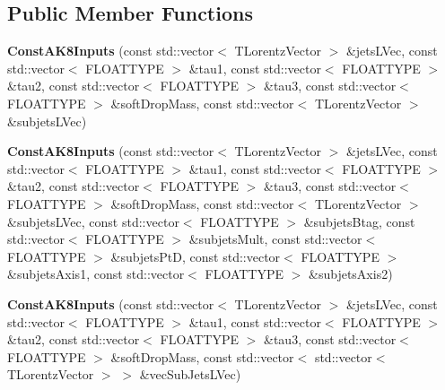 \subsection*{Public Member Functions}
\begin{DoxyCompactItemize}
\item 
\hypertarget{classttUtility_1_1ConstAK8Inputs_aaae2a8597035f10337b5454e34af790c}{{\bfseries Const\-A\-K8\-Inputs} (const std\-::vector$<$ T\-Lorentz\-Vector $>$ \&jets\-L\-Vec, const std\-::vector$<$ F\-L\-O\-A\-T\-T\-Y\-P\-E $>$ \&tau1, const std\-::vector$<$ F\-L\-O\-A\-T\-T\-Y\-P\-E $>$ \&tau2, const std\-::vector$<$ F\-L\-O\-A\-T\-T\-Y\-P\-E $>$ \&tau3, const std\-::vector$<$ F\-L\-O\-A\-T\-T\-Y\-P\-E $>$ \&soft\-Drop\-Mass, const std\-::vector$<$ T\-Lorentz\-Vector $>$ \&subjets\-L\-Vec)}\label{classttUtility_1_1ConstAK8Inputs_aaae2a8597035f10337b5454e34af790c}

\item 
\hypertarget{classttUtility_1_1ConstAK8Inputs_a4f18f62b24822d170a0cebad8c70eb2b}{{\bfseries Const\-A\-K8\-Inputs} (const std\-::vector$<$ T\-Lorentz\-Vector $>$ \&jets\-L\-Vec, const std\-::vector$<$ F\-L\-O\-A\-T\-T\-Y\-P\-E $>$ \&tau1, const std\-::vector$<$ F\-L\-O\-A\-T\-T\-Y\-P\-E $>$ \&tau2, const std\-::vector$<$ F\-L\-O\-A\-T\-T\-Y\-P\-E $>$ \&tau3, const std\-::vector$<$ F\-L\-O\-A\-T\-T\-Y\-P\-E $>$ \&soft\-Drop\-Mass, const std\-::vector$<$ T\-Lorentz\-Vector $>$ \&subjets\-L\-Vec, const std\-::vector$<$ F\-L\-O\-A\-T\-T\-Y\-P\-E $>$ \&subjets\-Btag, const std\-::vector$<$ F\-L\-O\-A\-T\-T\-Y\-P\-E $>$ \&subjets\-Mult, const std\-::vector$<$ F\-L\-O\-A\-T\-T\-Y\-P\-E $>$ \&subjets\-Pt\-D, const std\-::vector$<$ F\-L\-O\-A\-T\-T\-Y\-P\-E $>$ \&subjets\-Axis1, const std\-::vector$<$ F\-L\-O\-A\-T\-T\-Y\-P\-E $>$ \&subjets\-Axis2)}\label{classttUtility_1_1ConstAK8Inputs_a4f18f62b24822d170a0cebad8c70eb2b}

\item 
\hypertarget{classttUtility_1_1ConstAK8Inputs_af9b5c0cf9a84a55923c86ff27ec8ce1d}{{\bfseries Const\-A\-K8\-Inputs} (const std\-::vector$<$ T\-Lorentz\-Vector $>$ \&jets\-L\-Vec, const std\-::vector$<$ F\-L\-O\-A\-T\-T\-Y\-P\-E $>$ \&tau1, const std\-::vector$<$ F\-L\-O\-A\-T\-T\-Y\-P\-E $>$ \&tau2, const std\-::vector$<$ F\-L\-O\-A\-T\-T\-Y\-P\-E $>$ \&tau3, const std\-::vector$<$ F\-L\-O\-A\-T\-T\-Y\-P\-E $>$ \&soft\-Drop\-Mass, const std\-::vector$<$ std\-::vector$<$ T\-Lorentz\-Vector $>$ $>$ \&vec\-Sub\-Jets\-L\-Vec)}\label{classttUtility_1_1ConstAK8Inputs_af9b5c0cf9a84a55923c86ff27ec8ce1d}


\end{DoxyCompactItemize}
